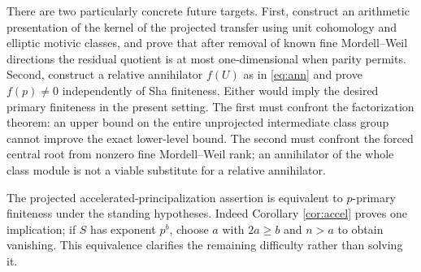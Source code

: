 \documentclass[11pt,a4paper]{article}
\theoremstyle{definition}\newtheorem{definition}[theorem]{Definition}
\theoremstyle{remark}\newtheorem{remark}[theorem]{Remark}
\numberwithin{equation}{section}
\begin{document}
There are two particularly concrete future targets. First, construct an arithmetic presentation of the kernel of the projected transfer using unit cohomology and elliptic motivic classes, and prove that after removal of known fine Mordell--Weil directions the residual quotient is at most one-dimensional when parity permits. Second, construct a relative annihilator $f(U)$ as in \eqref{eq:ann} and prove $f(p)\ne0$ independently of Sha finiteness. Either would imply the desired primary finiteness in the present setting. The first must confront the factorization theorem: an upper bound on the entire unprojected intermediate class group cannot improve the exact lower-level bound. The second must confront the forced central root from nonzero fine Mordell--Weil rank; an annihilator of the whole class module is not a viable substitute for a relative annihilator.

The projected accelerated-principalization assertion is equivalent to $p$-primary finiteness under the standing hypotheses. Indeed Corollary \ref{cor:accel} proves one implication; if $S$ has exponent $p^b$, choose $a$ with $2a\ge b$ and $n>a$ to obtain vanishing. This equivalence clarifies the remaining difficulty rather than solving it.
\end{document}
